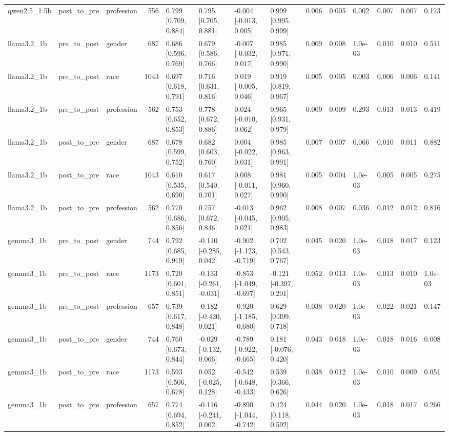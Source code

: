 \begin{tabular}{lllrllllrrlrrl}
qwen2.5_1.5b & post_to_pre & profession & 556 & 0.799 [0.709, 0.884] & 0.795 [0.705, 0.881] & -0.004 [-0.013, 0.005] & 0.999 [0.995, 0.999] & 0.006 & 0.005 & 0.002 & 0.007 & 0.007 & 0.173 \\
llama3.2_1b & pre_to_post & gender & 687 & 0.686 [0.596, 0.769] & 0.679 [0.586, 0.766] & -0.007 [-0.032, 0.017] & 0.985 [0.971, 0.990] & 0.009 & 0.008 & 1.0e-03 & 0.010 & 0.010 & 0.541 \\
llama3.2_1b & pre_to_post & race & 1043 & 0.697 [0.618, 0.791] & 0.716 [0.631, 0.816] & 0.019 [-0.005, 0.046] & 0.919 [0.819, 0.967] & 0.005 & 0.005 & 0.003 & 0.006 & 0.006 & 0.141 \\
llama3.2_1b & pre_to_post & profession & 562 & 0.753 [0.652, 0.853] & 0.778 [0.672, 0.886] & 0.024 [-0.010, 0.062] & 0.965 [0.931, 0.979] & 0.009 & 0.009 & 0.293 & 0.013 & 0.013 & 0.419 \\
llama3.2_1b & post_to_pre & gender & 687 & 0.678 [0.599, 0.752] & 0.682 [0.603, 0.760] & 0.004 [-0.022, 0.031] & 0.985 [0.963, 0.991] & 0.007 & 0.007 & 0.066 & 0.010 & 0.011 & 0.882 \\
llama3.2_1b & post_to_pre & race & 1043 & 0.610 [0.535, 0.690] & 0.617 [0.540, 0.701] & 0.008 [-0.011, 0.027] & 0.981 [0.960, 0.990] & 0.005 & 0.004 & 1.0e-03 & 0.005 & 0.005 & 0.275 \\
llama3.2_1b & post_to_pre & profession & 562 & 0.770 [0.686, 0.856] & 0.757 [0.672, 0.846] & -0.013 [-0.045, 0.021] & 0.962 [0.905, 0.983] & 0.008 & 0.007 & 0.036 & 0.012 & 0.012 & 0.816 \\
gemma3_1b & pre_to_post & gender & 744 & 0.792 [0.685, 0.919] & -0.110 [-0.285, 0.042] & -0.902 [-1.123, -0.719] & 0.702 [0.543, 0.767] & 0.045 & 0.020 & 1.0e-03 & 0.018 & 0.017 & 0.123 \\
gemma3_1b & pre_to_post & race & 1173 & 0.720 [0.601, 0.851] & -0.133 [-0.261, -0.031] & -0.853 [-1.049, -0.697] & -0.121 [-0.397, 0.201] & 0.052 & 0.013 & 1.0e-03 & 0.013 & 0.010 & 1.0e-03 \\
gemma3_1b & pre_to_post & profession & 657 & 0.739 [0.617, 0.848] & -0.182 [-0.420, 0.021] & -0.920 [-1.185, -0.680] & 0.629 [0.399, 0.718] & 0.038 & 0.020 & 1.0e-03 & 0.022 & 0.021 & 0.147 \\
gemma3_1b & post_to_pre & gender & 744 & 0.760 [0.673, 0.844] & -0.029 [-0.132, 0.066] & -0.789 [-0.922, -0.665] & 0.181 [-0.076, 0.420] & 0.043 & 0.018 & 1.0e-03 & 0.018 & 0.016 & 0.008 \\
gemma3_1b & post_to_pre & race & 1173 & 0.593 [0.506, 0.678] & 0.052 [-0.025, 0.128] & -0.542 [-0.648, -0.433] & 0.539 [0.366, 0.626] & 0.038 & 0.012 & 1.0e-03 & 0.010 & 0.009 & 0.051 \\
gemma3_1b & post_to_pre & profession & 657 & 0.774 [0.694, 0.852] & -0.116 [-0.241, 0.002] & -0.890 [-1.044, -0.742] & 0.424 [0.118, 0.592] & 0.044 & 0.020 & 1.0e-03 & 0.018 & 0.017 & 0.266 \\
\bottomrule
\end{tabular}
